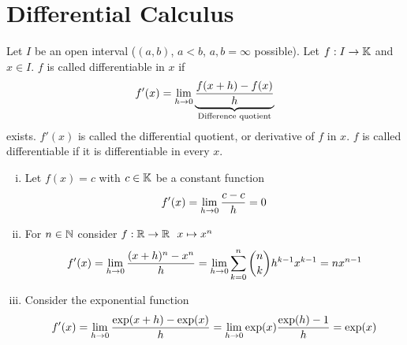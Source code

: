 \documentclass[../../script.tex]{subfiles}
\begin{document}
\section{Differential Calculus}

\begin{defi}
    Let $I$ be an open interval ($(a, b)$, $a < b$, $a, b = \infty$ possible). Let $f: I \rightarrow \mathbb{K}$ and $x \in I$.
    $f$ is called differentiable in $x$ if 
    \[
        f'(x) = \lim_{h \rightarrow 0} \underbrace{\frac{f(x + h) - f(x)}{h}}_{\text{Difference quotient}}
    \]
    exists. $f'(x)$ is called the differential quotient, or derivative of $f$ in $x$. $f$ is called differentiable if it is differentiable in every $x$.
\end{defi}

\begin{eg}
    \begin{enumerate}[(i)]
        \item Let $f(x) = c$ with $c \in \mathbb{K}$ be a constant function 
        \[
            f'(x) = \lim_{h \rightarrow 0} \frac{c - c}{h} = 0
        \]

        \item For $n \in \mathbb{N}$ consider $f: \mathbb{R} \rightarrow \mathbb{R} ~~x \mapsto x^n$
        \[
            f'(x) = \lim_{h \rightarrow 0} \frac{(x + h)^n - x^n}{h} = \lim_{h \rightarrow 0} \sum_{k=0}^n \binom{n}{k}h^{k-1}x^{k-1} = nx^{n-1}
        \]

        \item Consider the exponential function 
        \[
            f'(x) = \lim_{h \rightarrow 0} \frac{\exp(x + h) - \exp(x)}{h} = \lim_{h \rightarrow 0} \exp(x) \frac{\exp(h) - 1}{h} = \exp(x)
        \]
    \end{enumerate}
\end{eg}
\end{document}
